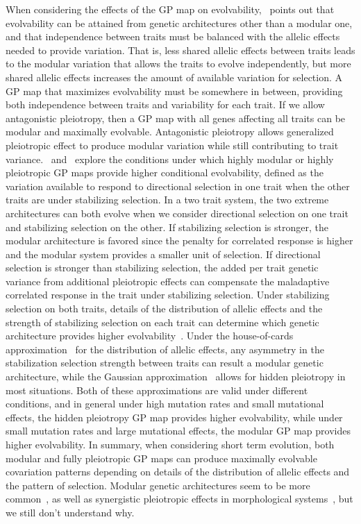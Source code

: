 \begin{refsection}
When considering the effects of the GP map on
evolvability,~\textcite{Hansen2003-fh} points out that evolvability can be
attained from genetic architectures other than a modular one, and that
independence between traits must be balanced with the allelic effects needed
to provide variation. That is, less shared allelic effects between traits
leads to the modular variation that allows the traits to evolve independently,
but more shared allelic effects increases the amount of available variation
for selection. A GP map that maximizes evolvability must be somewhere in
between, providing both independence between traits and variability for each
trait. If we allow antagonistic pleiotropy, then a GP map with all genes
affecting all traits can be modular and maximally evolvable. Antagonistic
pleiotropy allows generalized pleiotropic effect to produce modular variation
while still contributing to trait variance.~\textcite{Hansen2003-fh}
and~\textcite{Pavlicev2011-xm} explore the conditions under which highly
modular or highly pleiotropic GP maps provide higher conditional evolvability,
defined as the variation available to respond to directional selection in one
trait when the other traits are under stabilizing selection. In a two trait
system, the two extreme architectures can both evolve when we consider
directional selection on one trait and stabilizing selection on the other. If
stabilizing selection is stronger, the modular architecture is favored since
the penalty for correlated response is higher and the modular system provides
a smaller unit of selection. If directional selection is stronger than
stabilizing selection, the added per trait genetic variance from additional
pleiotropic effects can compensate the maladaptive correlated response in the
trait under stabilizing selection. Under stabilizing selection on both traits,
details of the distribution of allelic effects and the strength of stabilizing
selection on each trait can determine which genetic architecture provides
higher evolvability~\parencite{Pavlicev2011-xm}. Under the house-of-cards
approximation~\parencite{Turelli1984-cp} for the distribution of allelic
effects, any asymmetry in the stabilization selection strength between traits
can result a modular genetic architecture, while the Gaussian
approximation~\parencite{Lande1980-kn} allows for hidden pleiotropy in most
situations. Both of these approximations are valid under different conditions,
and in general under high mutation rates and small mutational effects, the
hidden pleiotropy GP map provides higher evolvability, while under small
mutation rates and large mutational effects, the modular GP map provides
higher evolvability. In summary, when considering short term evolution, both
modular and fully pleiotropic GP maps can produce maximally evolvable
covariation patterns depending on details of the distribution of allelic
effects and the pattern of selection. Modular genetic architectures seem to be
more common~\parencite{Wagner2007-cx}, as well as synergistic pleiotropic
effects in morphological systems~\parencite{Kenney-Hunt2008-bd}, but we still
don't understand why.


\end{refsection}
